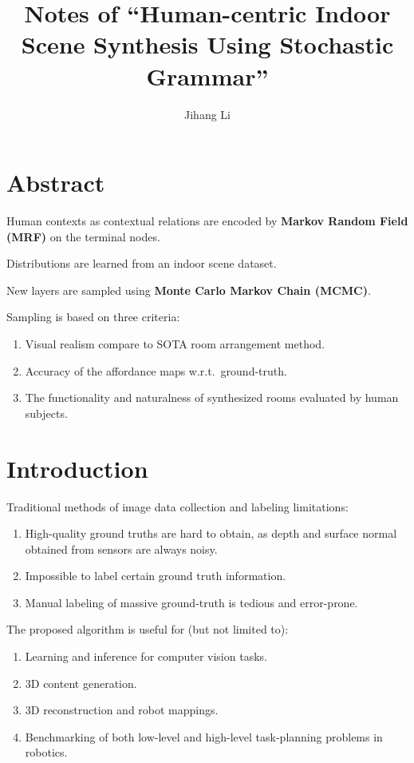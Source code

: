 \documentclass[10pt]{article}
\title{Notes of ``Human-centric Indoor Scene Synthesis Using Stochastic Grammar''}
\author{Jihang Li}
\begin{document}
\maketitle
\tableofcontents

\section*{Abstract}%
\label{sec:abstract}
 Human contexts as contextual relations are encoded by \textbf{Markov Random
 Field (MRF)} on the terminal nodes.

 Distributions are learned from an indoor scene dataset.

 New layers are sampled using \textbf{Monte Carlo Markov Chain (MCMC)}.

 Sampling is based on three criteria:
\begin{enumerate}
  \item Visual realism compare to SOTA room arrangement method.
  \item Accuracy of the affordance maps w.r.t.\ ground-truth.
  \item The functionality and naturalness of synthesized rooms evaluated by
    human subjects.
\end{enumerate}

\section{Introduction}%
\label{sec:introduction}
Traditional methods of image data collection and labeling limitations:
%
\begin{enumerate}
  \item High-quality ground truths are hard to obtain, as depth and surface
    normal obtained from sensors are always noisy.
  \item Impossible to label certain ground truth information.
  \item Manual labeling of massive ground-truth is tedious and error-prone.
\end{enumerate}

The proposed algorithm is useful for (but not limited to):
%
\begin{enumerate}
  \item Learning and inference for computer vision tasks.
  \item 3D content generation.
  \item 3D reconstruction and robot mappings.
  \item Benchmarking of both low-level and high-level task-planning problems in
    robotics.
\end{enumerate}
\end{document}
